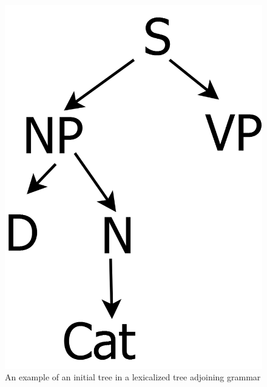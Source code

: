 \begin{figure}[ht]
\centering
\begin{minipage}[b]{0.45\linewidth}
\centering
\includegraphics[width=\linewidth]{initial-example.png}
\caption{An example of an initial tree in a lexicalized tree adjoining grammar}
\label{initial-tree-example}
\end{minipage}
\quad
\begin{minipage}[b]{0.45\linewidth}
\centering

\end{minipage}
\end{figure}
